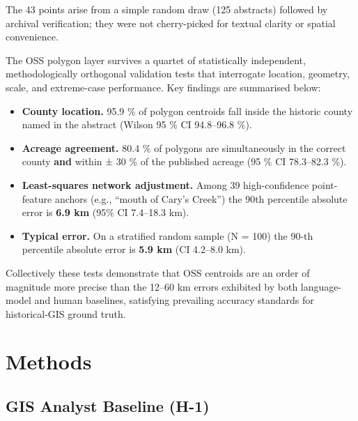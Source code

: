 The 43 points arise from a simple random draw (125 abstracts) followed
by archival verification; they were not cherry-picked for textual
clarity or spatial convenience.

The OSS polygon layer survives a quartet of statistically independent,
methodologically orthogonal validation tests that interrogate location,
geometry, scale, and extreme-case performance. Key findings are
summarised below:

\begin{itemize}
\tightlist
\item
  \textbf{County location.} 95.9 \% of polygon centroids fall inside the
  historic county named in the abstract (Wilson 95 \% CI 94.8--96.8 \%).
\item
  \textbf{Acreage agreement.} 80.4 \% of polygons are simultaneously in
  the correct county \textbf{and} within ± 30 \% of the published
  acreage (95 \% CI 78.3--82.3 \%).
\item
  \textbf{Least-squares network adjustment.} Among 39 high-confidence
  point-feature anchors (e.g., ``mouth of Cary's Creek'') the 90th
  percentile absolute error is \textbf{6.9 km} (95\% CI 7.4--18.3 km).
\item
  \textbf{Typical error.} On a stratified random sample (N = 100) the
  90-th percentile absolute error is \textbf{5.9 km} (CI 4.2--8.0 km).
\end{itemize}

Collectively these tests demonstrate that OSS centroids are an order of
magnitude more precise than the 12--60 km errors exhibited by both
language-model and human baselines, satisfying prevailing accuracy
standards for historical-GIS ground truth.

\section{Methods}\label{methods}

\subsection{GIS Analyst Baseline
(H-1)}\label{gis-analyst-baseline-h-1}

